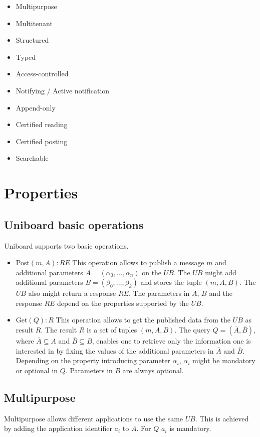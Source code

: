\documentclass[bibtotoc,halfparskip,oneside]{scrreprt}
\newcommand{\UB}{\ensuremath{\mathit{UB}}\xspace}
\begin{document}
\begin{itemize}
	\item Multipurpose
	\item Multitenant
	\item Structured
	\item Typed
	\item Access-controlled
	\item Notifying / Active notification
	\item Append-only
	\item Certified reading
	\item Certified posting
	\item Searchable
\end{itemize}

\section{Properties}
\subsection{Uniboard basic operations}

Uniboard supports two basic operations.
\begin{itemize}
	\item Post$(m,A):RE$ \newline This operation allows to publish a message $m$ and additional parameters $A=(\alpha_0,\dots,\alpha_n)$  on the \UB. The \UB might add additional parameters $B=(\beta_0,\dots,\beta_k)$ and stores the tuple $(m,A,B)$. The \UB also might return a response $RE$. The parameters in $A$, $B$ and the response $RE$ depend on the properties supported by the \UB.
	\item Get$(Q):R$ \newline This operation allows to get the published data from the \UB as result $R$. The result $R$ is a set of tuples $(m,A,B)$. The query $Q=(\overline{A}, \overline{B})$, where $\overline{A} \subseteq A$ and  $\overline{B} \subseteq B$, enables one to retrieve only the information one is interested in by fixing the values of the additional parameters in $\overline{A}$ and $\overline{B}$. Depending on the property introducing parameter $\alpha_i$, $\alpha_i$ might be mandatory or optional in $Q$. Parameters in $B$ are always optional.
\end{itemize}

\subsection{Multipurpose}
Multipurpose allows different applications to use the same \UB. This is achieved by adding the application identifier $a_i$ to $A$. For $Q$ $a_i$ is mandatory.
\end{document}
